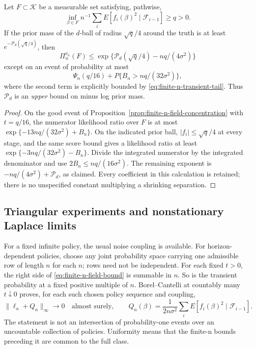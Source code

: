 \begin{theorem}
\label{thm:finite-n-posterior-separation}
Let \(F\subset\mathcal K\) be a measurable set satisfying, pathwise,
\[
 \inf_{\beta\in F}n^{-1}\sum_iE[f_i(\beta)^2\mid\mathcal F_{i-1}]
 \ge q>0.
\]
If the prior mass of the \(d\)-ball of radius \(\sqrt q/4\) around the
truth is at least \(e^{-\mathcal P_d(\sqrt q/4)}\), then
\begin{equation}
 \Pi_n^{\nu_n}(F)\le
 \exp\{\mathcal P_d(\sqrt q/4)-nq/(4\sigma^2)\}
 \label{eq:finite-n-posterior-mass}
\end{equation}
except on an event of probability at most
\begin{equation}
 \Psi_n(q/16)+P\{B_n>nq/(32\sigma^2)\},
 \label{eq:finite-n-posterior-failure}
\end{equation}
where the second term is explicitly bounded by
\eqref{eq:finite-n-transient-tail}.
Thus \(\mathcal P_d\) is an \emph{upper} bound on minus log prior mass.
\end{theorem}
\begin{proof}
On the good event of Proposition~\ref{prop:finite-n-field-concentration}
with \(t=q/16\), the numerator likelihood ratio over \(F\) is at most
\(\exp\{-13nq/(32\sigma^2)+B_n\}\).
On the indicated prior ball, \(|f_i|\le\sqrt q/4\) at every stage, and
the same score bound gives a likelihood ratio at least
\(\exp\{-3nq/(32\sigma^2)-B_n\}\).
Divide the integrated numerator by the integrated denominator and use
\(2B_n\le nq/(16\sigma^2)\). The remaining exponent is
\(-nq/(4\sigma^2)+\mathcal P_d\), as claimed. Every coefficient in this
calculation is retained; there is no unspecified constant multiplying a
shrinking separation.
\end{proof}

\subsection{Triangular experiments and nonstationary Laplace limits}
For a fixed infinite policy, the usual noise coupling is available. For
horizon-dependent policies, choose any joint probability space carrying
one admissible row of length \(n\) for each \(n\); rows need not be
independent. For each fixed \(t>0\), the right side of
\eqref{eq:finite-n-field-bound} is summable in \(n\). So is the transient
probability at a fixed positive multiple of \(n\). Borel--Cantelli at
countably many \(t\downarrow0\) proves, for each such chosen policy
sequence and coupling,
\begin{equation}
 \|\ell_n+Q_n\|_\infty\longrightarrow0\quad\text{almost surely},\qquad
 Q_n(\beta)=\frac1{2n\sigma^2}\sum_i
 E[f_i(\beta)^2\mid\mathcal F_{i-1}].
 \label{eq:adaptive-uniform-likelihood-tracking}
\end{equation}
The statement is not an intersection of probability-one events over an
uncountable collection of policies. Uniformity means that the finite-n
bounds preceding it are common to the full class.


